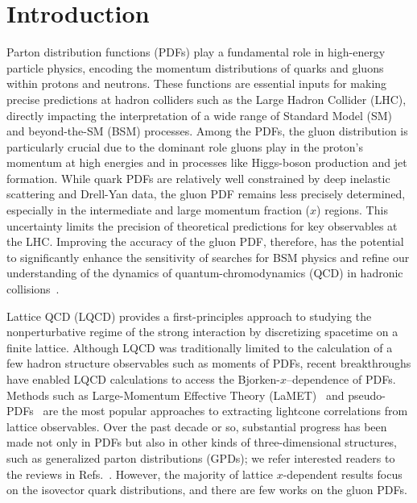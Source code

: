 \section{Introduction}
\label{sec:intro}

Parton distribution functions (PDFs) play a fundamental role in high-energy particle physics, encoding the momentum distributions of quarks and gluons within protons and neutrons.
These functions are essential inputs for making precise predictions at hadron colliders such as the Large Hadron Collider (LHC), directly impacting the interpretation of a wide range of Standard Model (SM) and beyond-the-SM (BSM) processes.
Among the PDFs, the gluon distribution is particularly crucial due to the dominant role gluons play in the proton's momentum at high energies and in processes like Higgs-boson production and jet formation.
While quark PDFs are relatively well constrained by deep inelastic scattering and Drell-Yan data, the gluon PDF remains less precisely determined, especially in the intermediate and large momentum fraction ($x$) regions.
This uncertainty limits the precision of theoretical predictions for key observables at the LHC.
Improving the accuracy of the gluon PDF, therefore, has the potential to significantly enhance the sensitivity of searches for BSM physics and refine our understanding of the dynamics of quantum-chromodynamics (QCD) in hadronic collisions~\cite{Amoroso:2022eow}.

Lattice QCD (LQCD) provides a first-principles approach to studying the nonperturbative regime of the strong interaction by discretizing spacetime on a finite lattice.
Although LQCD was traditionally limited to the calculation of a few hadron structure observables such as moments of PDFs, recent breakthroughs have enabled LQCD calculations to access the Bjorken-$x$--dependence of PDFs.
Methods such as Large-Momentum Effective Theory (LaMET)~\cite{Ji:2013dva} and pseudo-PDFs~\cite{Radyushkin:2017cyf} are the most popular approaches to extracting lightcone correlations from lattice observables.
Over the past decade or so, substantial progress has been made not only in PDFs but also in other kinds of three-dimensional structures, such as generalized parton distributions (GPDs);
we refer interested readers to the reviews in Refs.~\cite{Ji:2020ect,Constantinou:2020hdm,Lin:2023kxn}.
However, the majority of lattice $x$-dependent results focus on the isovector quark distributions, and there are few works on the gluon PDFs.


